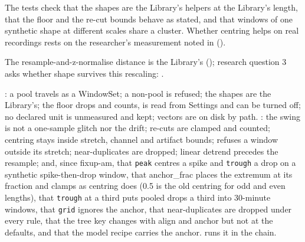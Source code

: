 The tests check that the shapes are the Library's helpers at the Library's length, that the
floor and the re-cut bounds behave as stated, and that windows of one synthetic shape at
different scales share a cluster. Whether centring helps on real recordings rests on the
researcher's measurement noted in  ().

The resample-and-z-normalise distance is the Library's ();
research question 3 asks whether shape survives this rescaling:
.

: a pool travels as a WindowSet; a non-pool is refused; the
shapes are the Library's; the floor drops and counts, is read from Settings and can be turned
off; no declared unit is unmeasured and kept; vectors are on disk by path.
: the swing is not a one-sample glitch nor the drift;
re-cuts are clamped and counted; centring stays inside stretch, channel and artifact bounds;
 refuses a window outside its stretch; near-duplicates are dropped; linear
detrend precedes the resample; and, since fixup-am, that \texttt{peak} centres a spike and
\texttt{trough} a drop on a synthetic spike-then-drop window, that anchor\_frac places the
extremum at its fraction and clamps as centring does (0.5 is the old centring for odd and even
lengths), that \texttt{trough} at a third puts pooled drops a third into 30-minute windows,
that \texttt{grid} ignores the anchor, that near-duplicates are dropped under every rule, that
the tree key changes with align and anchor but not at the defaults, and that the model recipe
carries the anchor.  runs it in the chain.

